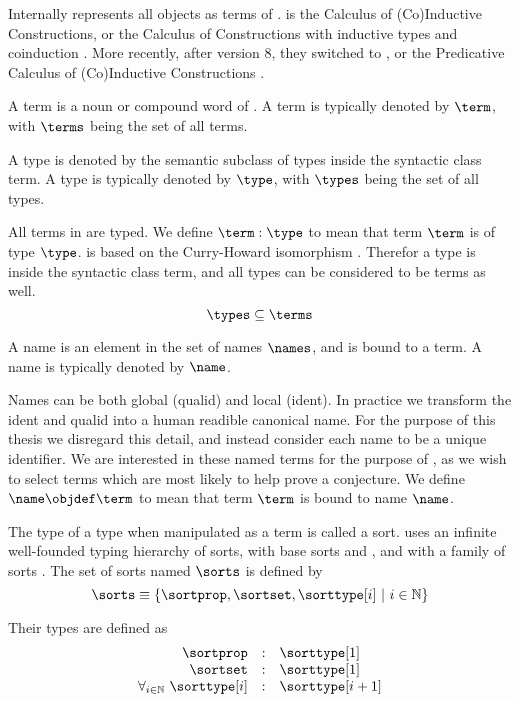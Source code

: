 Internally \coq represents all objects as terms  of \cic{}.
\cic is the Calculus of (Co)Inductive Constructions,
or the Calculus of Constructions \cite{coquand1988calculus} with inductive types and coinduction \cite{huet1987induction} \cite{coquand1990inductively}.
More recently, after \coq version 8, they switched to \pcic {}, or the Predicative Calculus of (Co)Inductive Constructions \cite{bertot2013interactive}.

\begin{definition}[term]
	A term is a noun or compound word of \pcic.
	A term is typically denoted by $\term$,
	with $\terms$ being the set of all terms.
\end{definition}

\begin{definition}[type]\label{def:type}
	A type is denoted by the semantic subclass of types inside the syntactic class term.
	A type is typically denoted by $\type$, with $\types$ being the set of all types.
\end{definition}

All terms in \coq are typed.
We define $\term : \type$ to mean that term $\term$ is of type $\type$.
\coq is based on the Curry-Howard isomorphism \cite{howard1980formulae}.
Therefor a type is inside the syntactic class term, and all types can be considered to be terms as well.
\[ \types \subseteq \terms \]

\begin{definition}[name]
	A name is an element in the set of names $\names$, and is bound to a term. A name is typically denoted by $\name$.
\end{definition}
Names can be both global (qualid) and local (ident).
In practice we transform the ident and qualid into a human readible canonical name.
For the purpose of this thesis we disregard this detail, and instead consider each name to be a unique identifier.
We are interested in these named terms for the purpose of \premiseselection,
as we wish to select terms which are most likely to help prove a conjecture.
We define $\name \objdef \term$ to mean that term $\term$ is bound to name $\name$.

\begin{definition}[sort]\label{def:sort}
	The type of a type when manipulated as a term is called a sort.
	\pcic uses an infinite well-founded typing hierarchy of sorts,
	with base sorts \sortprop{} and \sortset{},
	and with a family of sorts \sorttype[{i}].
	The set of sorts named $\sorts$ is defined by
	\[\sorts \equiv \{ \sortprop, \sortset, \sorttype[{i}] ~|~ i \in \mathbb{N} \} \]

	Their types are defined as
	\[
		\begin{array}{rcl}
			\sortprop & : & \sorttype[1] \\
			\sortset & : & \sorttype[1] \\
			\forall_{i \in \mathbb{N}}~ \sorttype[i] & : & \sorttype[{i+1}]
		\end{array}
	\]
\end{definition}

